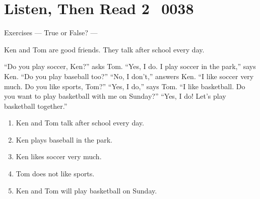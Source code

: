 \documentclass[aspectratio=169,dvipsnames]{beamer}
\newcommand{\myaudio}[1]{\href{#1}{\faVolumeUp}}
\begin{document}
\section{Listen, Then Read 2\,\,\,\,\,{\tiny 0038}\,{\scriptsize \myaudio{./audio/011_answer_do_reading.mp3}}}
\begin{frame}[plain,t]{Exercises --- True or False? ---}
\begin{tcolorbox}[colframe=ForestGreen,
  colback=NavyBlue!10!white,
  colbacktitle=NavyBlue!40!white,
  coltitle=black, %
before upper={\setlength{\parindent}{1.25em}},
 title={Do You Play Sports?\hfill{\tiny 0038}\quad{\scriptsize \myaudio{./audio/011_answer_do_reading.mp3}}}
]
\noindent{}Ken and Tom are good friends.
They talk after school every day.

``Do you play soccer, Ken?'' asks Tom.
``Yes, I do. I play soccer in the park,'' says Ken.
``Do you play baseball too?''
``No, I don't,'' answers Ken.
``I like soccer very much.
Do you like sports, Tom?''
``Yes, I do,'' says Tom.
``I like basketball.
Do you want to play basketball with me on Sunday?''
``Yes, I do!
Let's play basketball together.''
\end{tcolorbox}

\vspace{-4pt}
\begin{enumerate}\setlength{\itemsep}{-3.2pt}
\item<2-> Ken and Tom talk after school every day.\hfill{}
\item<2-> Ken plays baseball in the park.\hfill{}
\item<2-> Ken likes soccer very much.\hfill{}
\item<2-> Tom does not like sports.\hfill{}
\item<2-> Ken and Tom will play basketball on Sunday.\hfill{}
\end{enumerate}
\end{frame}
\end{document}
